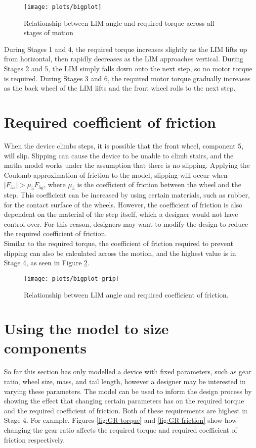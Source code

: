 \begin{figure}[h]
	\centering
	\texttt{[image: plots/bigplot]}
	\caption{Relationship between LIM angle and required torque across all stages of motion}
	\label{fig:bigplot}
\end{figure}

During Stages 1 and 4, the required torque increases slightly as the LIM lifts up from horizontal, then rapidly decreases as the LIM approaches vertical. During Stages 2 and 5, the LIM simply falls down onto the next step, so no motor torque is required. During Stages 3 and 6, the required motor torque gradually increases as the back wheel of the LIM lifts and the front wheel rolls to the next step. 

\section{Required coefficient of friction}

When the device climbs steps, it is possible that the front wheel, component 5, will slip. Slipping can cause the device to be unable to climb stairs, and the maths model works under the assumption that there is no slipping. Applying the Coulomb approximation of friction to the model, slipping will occur when $|F_{5x}| > \mu_5 F_{5y}$, where $\mu_5$ is the coefficient of friction between the wheel and the step. This coefficient can be increased by using certain materials, such as rubber, for the contact surface of the wheels. However, the coefficient of friction is also dependent on the material of the step itself, which a designer would not have control over. For this reason, designers may want to modify the design to reduce the required coefficient of friction.\\
Similar to the required torque, the coefficient of friction required to prevent slipping can also be calculated across the motion, and the highest value is in Stage 4, as seen in Figure \ref{bigplot-grip}.

\begin{figure}[h]
	\centering
	\texttt{[image: plots/bigplot-grip]}
	\caption{Relationship between LIM angle and required coefficient of friction.}
	\label{bigplot-grip}
\end{figure}

\section{Using the model to size components}
So far this section has only modelled a device with fixed parameters, such as gear ratio, wheel size, mass, and tail length, however a designer may be interested in varying these parameters. The model can be used to inform the design process by showing the effect that changing certain parameters has on the required torque and the required coefficient of friction. Both of these requirements are highest in Stage 4. For example, Figures \ref{fig:GR-torque} and \ref{fig:GR-friction} show how changing the gear ratio affects the required torque and required coefficient of friction respectively.\\

